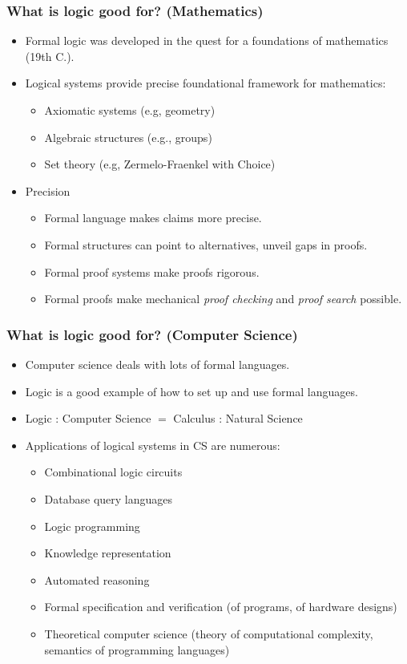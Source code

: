 \begin{frame}
  \frametitle{What is logic good for? (Mathematics)}

  \begin{itemize}[<+->]
  \item Formal logic was developed in the quest for a foundations of
  mathematics (19th C.).
  \item Logical systems provide precise foundational framework for
  mathematics:
    \begin{itemize}[<+->]
    \item Axiomatic systems (e.g, geometry)
    \item Algebraic structures (e.g., groups)
    \item Set theory (e.g, Zermelo-Fraenkel with Choice)
    \end{itemize}
  \item Precision
    \begin{itemize}[<+->]
    \item Formal language makes claims more precise.
    \item Formal structures can point to alternatives, unveil gaps in proofs.
    \item Formal proof systems make proofs rigorous.
    \item Formal proofs make mechanical \emph{proof checking} and \emph{proof search} possible.
    \end{itemize}
  \end{itemize}

\end{frame}


\begin{frame}
  \frametitle{What is logic good for? (Computer Science)}

  \begin{itemize}[<+->]
    \item Computer science deals with lots of formal languages.
    \item Logic is a good example of how to set up and use formal languages.
    \item Logic : Computer Science $=$ Calculus : Natural Science
    \item Applications of logical systems in CS are numerous:
  \begin{itemize}[<+->]
  \item Combinational logic circuits
  \item Database query languages
  \item Logic programming
  \item Knowledge representation
  \item Automated reasoning
  \item Formal specification and verification (of programs, of hardware designs)
  \item Theoretical computer science (theory of computational
  complexity, semantics of programming languages)
 \end{itemize}
\end{itemize}

\end{frame}
